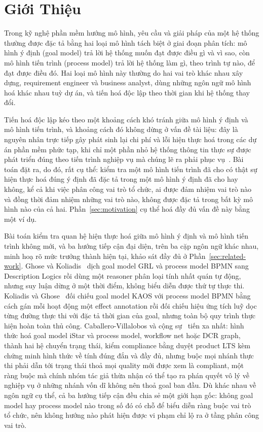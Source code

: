 \section{Giới Thiệu}\label{sec:introduction}

Trong kỹ nghệ phần mềm hướng mô hình, yêu cầu và giải pháp của một hệ thống thường được đặc tả bằng
hai loại mô hình tách biệt ở giai đoạn phân tích: mô hình ý định (goal model) trả lời hệ thống muốn
đạt được điều gì và vì sao, còn mô hình tiến trình (process model) trả lời hệ thống làm gì, theo
trình tự nào, để đạt được điều đó. Hai loại mô hình này thường do hai vai trò khác nhau xây dựng,
requirement engineer và business analyst, dùng những ngôn ngữ mô hình hoá khác nhau tuỳ dự án, và
tiến hoá độc lập theo thời gian khi hệ thống thay đổi.

Tiến hoá độc lập kéo theo một khoảng cách khó tránh giữa mô hình ý định và mô hình tiến trình, và
khoảng cách đó không dừng ở vấn đề tài liệu: đây là nguyên nhân trực tiếp gây phát sinh lại chi phí
và lỗi hiện thực hoá trong các dự án phần mềm phức tạp, khi chỉ một phần nhỏ hệ thống thông tin thực
sự được phát triển đúng theo tiến trình nghiệp vụ mà chúng lẽ ra phải phục
vụ~\cite{alignment2019slr}. Bài toán đặt ra, do đó, rất cụ thể: kiểm tra một mô hình tiến trình đã
cho có thật sự hiện thực hoá đúng ý định đã đặc tả trong một mô hình ý định đã cho hay không, kể cả
khi việc phân công vai trò tổ chức, ai được đảm nhiệm vai trò nào và đồng thời đảm nhiệm những vai
trò nào, không được đặc tả trong bất kỳ mô hình nào của cả hai. Phần~\ref{sec:motivation} cụ thể hoá
đầy đủ vấn đề này bằng một ví dụ.

Bài toán kiểm tra quan hệ hiện thực hoá giữa mô hình ý định và mô hình tiến trình không mới, và ba
hướng tiếp cận đại diện, trên ba cặp ngôn ngữ khác nhau, minh hoạ rõ mức trưởng thành hiện tại,
khảo sát đầy đủ ở Phần~\ref{sec:related-work}. Ghose và Koliadis~\cite{ghose2007validation} dịch
goal model GRL và process model BPMN sang Description Logics rồi dùng một reasoner phân loại tính
nhất quán tự động, nhưng suy luận dừng ở một thời điểm, không biểu diễn được thứ tự thực thi.
Koliadis và Ghose~\cite{koliadis2006goalbpm} đối chiếu goal model KAOS với process model BPMN bằng
cách gán mỗi hoạt động một effect annotation rồi đối chiếu hiệu ứng tích luỹ dọc từng đường thực thi
với đặc tả thời gian của goal, nhưng toàn bộ quy trình thực hiện hoàn toàn thủ công.
Caballero-Villalobos và cộng sự~\cite{caballero2026alig} tiến xa nhất: hình thức hoá goal model
iStar và process model, workflow net hoặc DCR graph, thành hai hệ chuyển trạng thái, kiểm compliance
bằng duyệt product LTS kèm chứng minh hình thức về tính đúng đắn và đầy đủ, nhưng buộc mọi nhánh
thực thi phải dẫn tới trạng thái thoả mọi quality mới được xem là compliant, một ràng buộc mà chính
nhóm tác giả thừa nhận có thể tạo ra phán quyết vô lý về nghiệp vụ ở những nhánh vốn dĩ không nên
thoả goal ban đầu. Dù khác nhau về ngôn ngữ cụ thể, cả ba hướng tiếp cận đều chia sẻ một giới hạn
gốc: không goal model hay process model nào trong số đó có chỗ để biểu diễn ràng buộc vai trò tổ
chức, nên không hướng nào phát hiện được vi phạm chỉ lộ ra ở tầng phân công vai trò.


